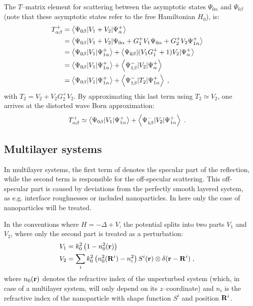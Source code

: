 The $T$--matrix element for scattering between the asymptotic states $\Psi_{0\alpha}$ and $\Psi_{0\beta}$ (note that these asymptotic states refer to the free Hamiltonian $H_0$), is:
\begin{align*}
  T^+_{\alpha\beta} &= \left\langle \Psi_{0\beta} \vert V_1+V_2 \vert \Psi^+_\alpha \right\rangle \nonumber \\
  & = \left\langle \Psi_{0\beta} \vert V_1+V_2 \vert \Psi_{0\alpha} + G^+_1V_1\Psi_{0\alpha} + G^+_2V_2\Psi^+_{1\alpha} \right\rangle \nonumber \\
  & = \left\langle \Psi_{0\beta} \vert V_1 \vert \Psi^+_{1\alpha} \right\rangle + \left\langle \Psi_{0\beta} \vert (V_1G^+_1 + 1)V_2 \vert \Psi^+_\alpha \right\rangle \\
  & = \left\langle \Psi_{0\beta} \vert V_1 \vert \Psi^+_{1\alpha} \right\rangle + \left\langle \Psi^-_{1\beta} \vert V_2 \vert \Psi^+_\alpha \right\rangle \nonumber \\
  & = \left\langle \Psi_{0\beta} \vert V_1 \vert \Psi^+_{1\alpha} \right\rangle + \left\langle \Psi^-_{1\beta} \vert T_2 \vert \Psi^+_{1\alpha} \right\rangle \; ,
\end{align*}
with $T_2 = V_2 + V_2G^+_2V_2$. By approximating this last term using $T_2 \simeq V_2$, one arrives at the distorted wave Born approximation:
\begin{equation}
  \label{eq:tdwba}
   T^+_{\alpha\beta} \simeq \left\langle \Psi_{0\beta} \vert V_1 \vert \Psi^+_{1\alpha} \right\rangle + \left\langle \Psi^-_{1\beta} \vert V_2 \vert \Psi^+_{1\alpha} \right\rangle \; .
\end{equation}

\subsection{Multilayer systems}
In multilayer systems, the first term of  denotes the specular part of the reflection, while the second term is responsible for the off-specular scattering. This off-specular part is caused by deviations from the perfectly smooth layered system, as e.g. interface roughnesses or included nanoparticles. In here only the case of nanoparticles will be treated.

In the conventions where $H=-\Delta + V$, the potential splits into two parts $V_1$ and $V_2$, where only the second part is treated as a perturbation:
\begin{align*}
  V_1 & = k_0^2\left( 1-n_0^2(\mathbf{r})\right)  \\
  V_2 & = \sum_i k_0^2\left( n_0^2(\mathbf{R}^i) - n_i^2 \right) S^i(\mathbf{r}) \otimes \delta(\mathbf{r}-\mathbf{R}^i) \; ,
\end{align*}
where $n_0(\mathbf{r})$ denotes the refractive index of the unperturbed system (which, in case of a multilayer system, will only depend on its $z$--coordinate) and $n_i$ is the refractive index of the nanoparticle with shape function $S^i$ and position $\mathbf{R}^i$.

